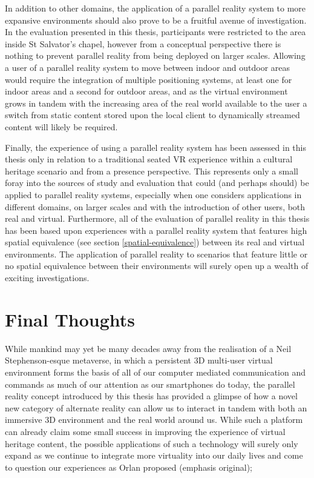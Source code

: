 In addition to other domains, the application of a parallel reality system to more expansive environments should also prove to be a fruitful avenue of investigation. In the evaluation presented in this thesis, participants were restricted to the area inside St Salvator's chapel, however from a conceptual perspective there is nothing to prevent parallel reality from being deployed on larger scales. Allowing a user of a parallel reality system to move between indoor and outdoor areas would require the integration of multiple positioning systems, at least one for indoor areas and a second for outdoor areas, and as the virtual environment grows in tandem with the increasing area of the real world available to the user a switch from static content stored upon the local client to dynamically streamed content will likely be required.

Finally, the experience of using a parallel reality system has been assessed in this thesis only in relation to a traditional seated VR experience within a cultural heritage scenario and from a presence perspective. This represents only a small foray into the sources of study and evaluation that could (and perhaps should) be applied to parallel reality systems, especially when one considers applications in different domains, on larger scales and with the introduction of other users, both real and virtual. Furthermore, all of the evaluation of parallel reality in this thesis has been based upon experiences with a parallel reality system that features high spatial equivalence (see section \ref{spatial-equivalence}) between its real and virtual environments. The application of parallel reality to scenarios that feature little or no spatial equivalence between their environments will surely open up a wealth of exciting investigations.


\section{Final Thoughts}

While mankind may yet be many decades away from the realisation of a Neil Stephenson-esque metaverse, in which a persistent 3D multi-user virtual environment forms the basis of all of our computer mediated communication and commands as much of our attention as our smartphones do today, the parallel reality concept introduced by this thesis has provided a glimpse of how a novel new category of alternate reality can allow us to interact in tandem with both an immersive 3D environment and the real world around us. While such a platform can already claim some small success in improving the experience of virtual heritage content, the possible applications of such a technology will surely only expand as we continue to integrate more virtuality into our daily lives and come to question our experiences as Orlan proposed (emphasis original);

